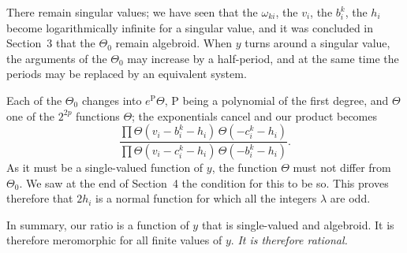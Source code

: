 \documentclass{article}
\begin{document}
There remain singular values; we have seen that the $\omega_{ki}$, the $v_{i}$, the $b_{i}^{k}$, the $h_{i}$ become logarithmically infinite for a singular value, and it was concluded in Section~3 that the $\Theta_{0}$ remain algebroid. When $y$ turns around a singular value, the arguments of the $\Theta_{0}$ may increase by a half-period, and at the same time the periods may be replaced by an equivalent system.

Each of the $\Theta_{0}$ changes into $e^{\mathrm{P}}\Theta$, $\mathrm{P}$ being a polynomial of the first degree, and
$\Theta$ one of the $2^{2p}$ functions $\Theta$; the exponentials cancel and our product becomes
\[
\frac{\prod \Theta(v_{i} - b_{i}^{k} - h_{i})\,\Theta(- c_{i}^{k} - h_{i})}{\prod \Theta(v_{i} - c_{i}^{k} - h_{i})\,\Theta(- b_{i}^{k} - h_{i})}.
\]
As it must be a single-valued function of $y$, the function $\Theta$ must not differ from $\Theta_{0}$. We saw at the end of Section~4 the condition for this to be so. This proves therefore that $2h_{i}$ is a normal function for which all the integers $\lambda$ are odd.

In summary, our ratio is a function of $y$ that is single-valued and algebroid. It is therefore meromorphic for all finite values of $y$. \emph{It is therefore rational.}
\end{document}
